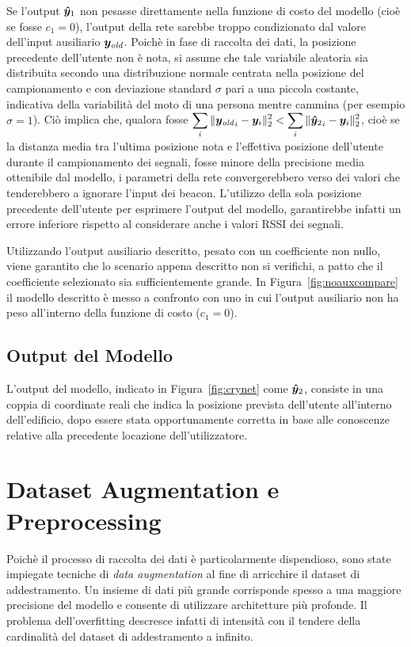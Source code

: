Se l'output \(\bm\hat{\bm y}_1\) non pesasse direttamente nella funzione di costo
del modello (cioè se fosse \(c_1 = 0\)), l'output della rete sarebbe troppo
condizionato dal valore dell'input ausiliario \(\bm y_{\mathit{old}}\). Poichè in fase di
raccolta dei dati, la posizione precedente dell'utente non è nota, si assume
che tale variabile aleatoria sia distribuita secondo una distribuzione normale
centrata nella posizione del campionamento e con deviazione standard \(\sigma\)
pari a una piccola costante, indicativa della variabilità del moto di una
persona mentre cammina (per esempio \( \sigma = 1 \)). Ciò implica che, qualora
fosse \(\displaystyle \sum_i\| {\bm y_{\mathit{old}}}_i - \bm y_i \|^2_2 < \sum_i \|
  {{}\bm\hat{\bm y}_2}_{i} - \bm y_i\|^2_2 \), cioè se la distanza media tra l'ultima
posizione nota e l'effettiva posizione dell'utente durante il campionamento dei
segnali, fosse minore della precisione media ottenibile dal modello, i
parametri della rete convergerebbero verso dei valori che tenderebbero a
ignorare l'input dei beacon. L'utilizzo della sola posizione precedente
dell'utente per esprimere l'output del modello, garantirebbe infatti un errore
inferiore rispetto al considerare anche i valori RSSI dei segnali.

Utilizzando l'output ausiliario descritto, pesato con un coefficiente non
nullo, viene garantito che lo scenario appena descritto non si verifichi, a
patto che il coefficiente selezionato sia sufficientemente grande. In
Figura~\ref{fig:noauxcompare} il modello descritto è messo a confronto con uno
in cui l'output ausiliario non ha peso all'interno della funzione di costo
(\(c_1 = 0\)).




\subsection{Output del Modello}
L'output del modello, indicato in Figura~\ref{fig:crynet} come \(\bm\hat{\bm y}_2\),
consiste in una coppia di coordinate reali che indica la posizione prevista
dell'utente all'interno dell'edificio, dopo essere stata opportunamente
corretta in base alle conoscenze relative alla precedente locazione
dell'utilizzatore.
\section{Dataset Augmentation e Preprocessing}
Poichè il processo di raccolta dei dati è particolarmente dispendioso, sono
state impiegate tecniche di \emph{data augmentation} al fine di arricchire il
dataset di addestramento. Un insieme di dati più grande corrisponde spesso a
una maggiore precisione del modello e consente di utilizzare architetture più
profonde. Il problema dell'overfitting descresce infatti di intensità con il
tendere della cardinalità del dataset di addestramento a infinito.

